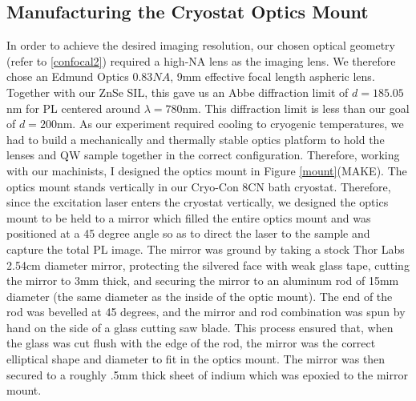 \subsection{Manufacturing the Cryostat Optics Mount}
\indent In order to achieve the desired imaging resolution, our chosen optical geometry (refer to \ref{confocal2}) required a high-NA lens as the imaging lens. We therefore chose an Edmund Optics $0.83NA$, 9mm effective focal length aspheric lens. Together with our ZnSe SIL, this gave us an Abbe diffraction limit of $d = 185.05$nm for PL centered around $\lambda = 780$nm. This diffraction limit is less than our goal of $d = 200$nm. As our experiment required cooling to cryogenic temperatures, we had to build a mechanically and thermally stable optics platform to hold the lenses and QW sample together in the correct configuration. Therefore, working with our machinists, I designed the optics mount in Figure \ref{mount}(MAKE). The optics mount stands vertically in our Cryo-Con 8CN bath cryostat. Therefore, since the excitation laser enters the cryostat vertically, we designed the optics mount to be held to a mirror which filled the entire optics mount and was positioned at a 45 degree angle so as to direct the laser to the sample and capture the total PL image. The mirror was ground by taking a stock Thor Labs 2.54cm diameter mirror, protecting the silvered face with weak glass tape, cutting the mirror to 3mm thick, and securing the mirror to an aluminum rod of 15mm diameter (the same diameter as the inside of the optic mount). The end of the rod was bevelled at 45 degrees, and the mirror and rod combination was spun by hand on the side of a glass cutting saw blade. This process ensured that, when the glass was cut flush with the edge of the rod, the mirror was the correct elliptical shape and diameter to fit in the optics mount. The mirror was then secured to a roughly .5mm thick sheet of indium which was epoxied to the mirror mount. 

